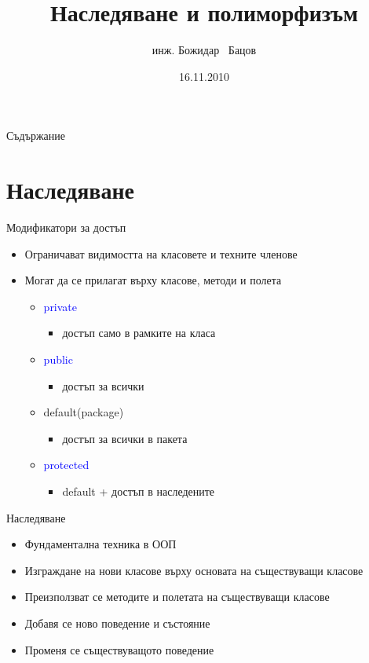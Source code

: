 \documentclass{beamer}
\title{Наследяване и полиморфизъм}
\author{инж. Божидар ~Бацов}
\institute{Drow Ltd.}
\date{16.11.2010}
\begin{document}
\begin{frame}
  \titlepage
\end{frame}

\begin{frame}{Съдържание}
  \transdissolve
  \tableofcontents[pausesections]
\end{frame}

\section{Наследяване}

\begin{frame}{Модификатори за достъп}
  \transdissolve
  \begin{itemize}
    \item Ограничават видимостта на класовете и техните членове
    \item Могат да се прилагат върху класове, методи и полета
    \begin{itemize}
    \item \textcolor{blue}{private}
      \begin{itemize}
      \item достъп само в рамките на класа
      \end{itemize}
    \item \textcolor{blue}{public}
      \begin{itemize}
      \item достъп за всички
      \end{itemize}
    \item default(package)
      \begin{itemize}
      \item достъп за всички в пакета
      \end{itemize}
    \item \textcolor{blue}{protected}
      \begin{itemize}
      \item default + достъп в наследените
      \end{itemize}
    \end{itemize}    
  \end{itemize}
\end{frame}

\begin{frame}{Наследяване}
  \transdissolve
  \begin{itemize}
  \item Фундаментална техника в ООП
  \item Изграждане на нови класове върху основата на съществуващи
    класове
  \item Преизползват се методите и полетата на съществуващи класове
  \item Добавя се ново поведение и състояние
  \item Променя се съществуващото поведение
  \end{itemize}
\end{frame}
\end{document}
